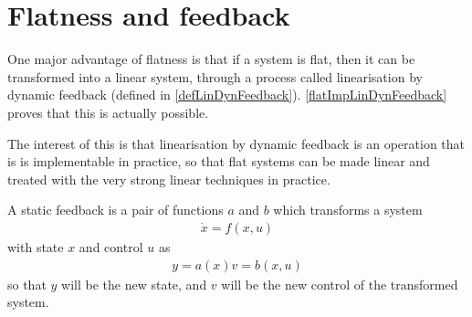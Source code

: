 \documentclass[12pt]{article}
\begin{document}
\section{Flatness and feedback} \label{flatnessAndFeedback}

\begin{remark}
  One major advantage of flatness is that if a system is flat, then it can be transformed into a linear system,
  through a process called linearisation by dynamic feedback (defined in \ref{defLinDynFeedback}). \ref{flatImpLinDynFeedback}
  proves that this is actually possible.  
  
  The interest of this is that linearisation by
  dynamic feedback is an operation that is is implementable in practice, so that flat systems can be made
  linear and treated with the very strong linear techniques in practice.
\end{remark}

\begin{definition} \label{defStaFeedback}
  A static feedback is a pair of functions $a$ and $b$ which transforms a system
  \begin{equation}\begin{aligned}
    \dot{x} = f(x,u)
  \end{aligned}\end{equation}
  with state $x$ and control $u$ as
  \begin{equation}\begin{aligned}
    y = a(x)
    v = b(x,u)
  \end{aligned}\end{equation}
  so that $y$ will be the new state, and $v$ will be the new control of the transformed system.
\end{definition}
\end{document}
